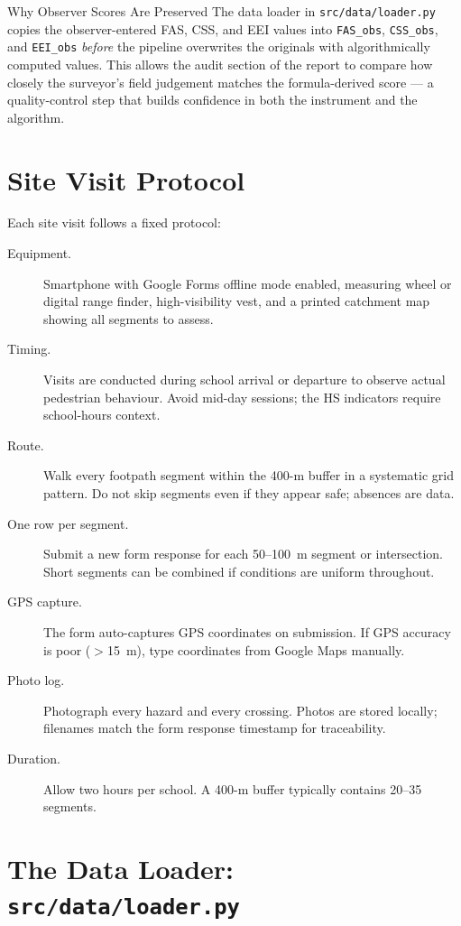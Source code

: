 \documentclass[11pt,a4paper,openany]{book}
\begin{document}
\begin{tipbox}{Why Observer Scores Are Preserved}
The data loader in \texttt{src/data/loader.py} copies the observer-entered FAS, CSS, and EEI values into \texttt{FAS\_obs}, \texttt{CSS\_obs}, and \texttt{EEI\_obs} \emph{before} the pipeline overwrites the originals with algorithmically computed values. This allows the audit section of the report to compare how closely the surveyor's field judgement matches the formula-derived score --- a quality-control step that builds confidence in both the instrument and the algorithm.
\end{tipbox}

\section{Site Visit Protocol}

Each site visit follows a fixed protocol:

\begin{description}
  \item[Equipment.] Smartphone with Google Forms offline mode enabled, measuring wheel or digital range finder, high-visibility vest, and a printed catchment map showing all segments to assess.
  \item[Timing.] Visits are conducted during school arrival or departure to observe actual pedestrian behaviour. Avoid mid-day sessions; the HS indicators require school-hours context.
  \item[Route.] Walk every footpath segment within the 400-m buffer in a systematic grid pattern. Do not skip segments even if they appear safe; absences are data.
  \item[One row per segment.] Submit a new form response for each 50--100~m segment or intersection. Short segments can be combined if conditions are uniform throughout.
  \item[GPS capture.] The form auto-captures GPS coordinates on submission. If GPS accuracy is poor ($>$15~m), type coordinates from Google Maps manually.
  \item[Photo log.] Photograph every hazard and every crossing. Photos are stored locally; filenames match the form response timestamp for traceability.
  \item[Duration.] Allow two hours per school. A 400-m buffer typically contains 20--35 segments.
\end{description}

\section{The Data Loader: \texttt{src/data/loader.py}}
\end{document}
